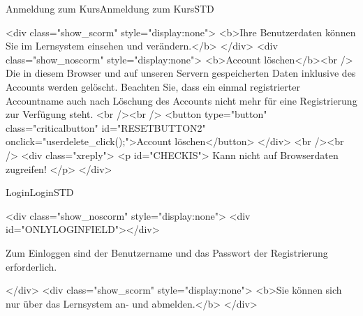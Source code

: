 \begin{MXContent}{Anmeldung zum Kurs}{Anmeldung zum Kurs}{STD}
% 
% 

\begin{html}
<div class="show_scorm" style="display:none">
<b>Ihre Benutzerdaten können Sie im Lernsystem einsehen und verändern.</b>
</div>
<div class="show_noscorm" style="display:none">
<b>Account löschen</b><br />
Die in diesem Browser und auf unseren Servern gespeicherten Daten inklusive des Accounts werden gelöscht.
Beachten Sie, dass ein einmal registrierter Accountname auch nach Löschung des Accounts nicht mehr für eine Registrierung
zur Verfügung steht.
<br /><br />
<button type="button" class="criticalbutton" id="RESETBUTTON2" onclick="userdelete_click();">Account löschen</button>
</div>
<br /><br />
<div class="xreply">
<p id="CHECKIS">
Kann nicht auf Browserdaten zugreifen!
</p>
</div>
\end{html}
\end{MXContent}

\begin{MXContent}{Login}{Login}{STD}
\MGlobalLoginTag
{}
\begin{html}
<div class="show_noscorm" style="display:none">
<div id="ONLYLOGINFIELD"></div>
\end{html}

Zum Einloggen sind der Benutzername und das Passwort der Registrierung erforderlich.

\begin{html}
</div>
<div class="show_scorm" style="display:none">
<b>Sie können sich nur über das Lernsystem an- und abmelden.</b>
</div>
\end{html}

\end{MXContent}


